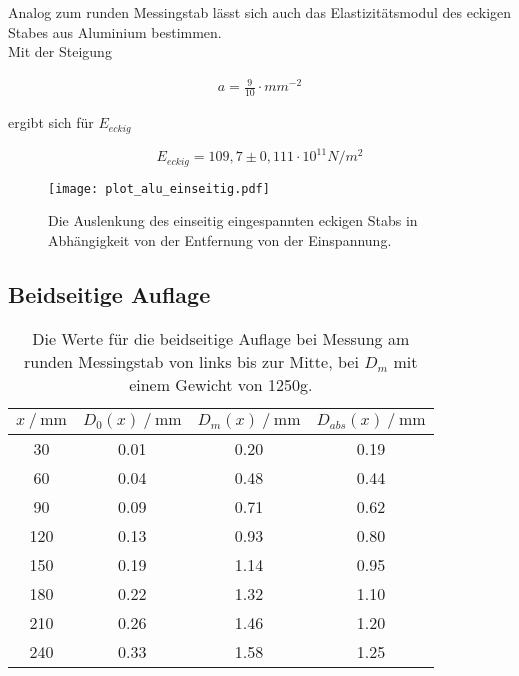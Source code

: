 Analog zum runden Messingstab lässt sich auch das Elastizitätsmodul des eckigen Stabes aus Aluminium bestimmen.\\
Mit der Steigung 

\begin{align*}
  a = \frac{9}{10} \cdot mm^{-2}
\end{align*}

ergibt sich für $E_{eckig}$ 

\begin{equation*}
  E_{eckig} =  109,7 \pm 0,111 \cdot 10^{11} N/m^2            
\end{equation*}


\begin{figure}[H]
  \centering
  \texttt{[image: plot\_alu\_einseitig.pdf]}
  \caption{Die Auslenkung des einseitig eingespannten eckigen Stabs in Abhängigkeit 
  von der Entfernung von der Einspannung.}
  \label{fig:plot_alu_einseitig}
\end{figure}


\subsection{Beidseitige Auflage}  %
\label{subsec:Beiseitige Auflage}


\begin{table}[H]
  \centering
  \caption{Die Werte für die beidseitige Auflage bei Messung am runden Messingstab von links bis zur Mitte, bei $D_m$ mit 
  einem Gewicht von 1250g.}
  \begin{tabular}{cccc}
    \toprule
    {$x \mathbin{/} \unit{\milli\metre}$} &
    {$D_0(x) \mathbin{/} \unit{\milli\metre}$} &
    {$D_m(x) \mathbin{/} \unit{\milli\metre}$} &
    {$D_{abs}(x) \mathbin{/} \unit{\milli\metre}$} \\
    \midrule
     30 & 0.01 & 0.20 & 0.19 \\  
     60 & 0.04 & 0.48 & 0.44 \\
     90 & 0.09 & 0.71 & 0.62 \\
    120 & 0.13 & 0.93 & 0.80 \\
    150 & 0.19 & 1.14 & 0.95 \\
    180 & 0.22 & 1.32 & 1.10 \\
    210 & 0.26 & 1.46 & 1.20 \\
    240 & 0.33 & 1.58 & 1.25 \\
    
    \bottomrule
  \end{tabular}
  \label{tab:Tabelle5}
\end{table}



